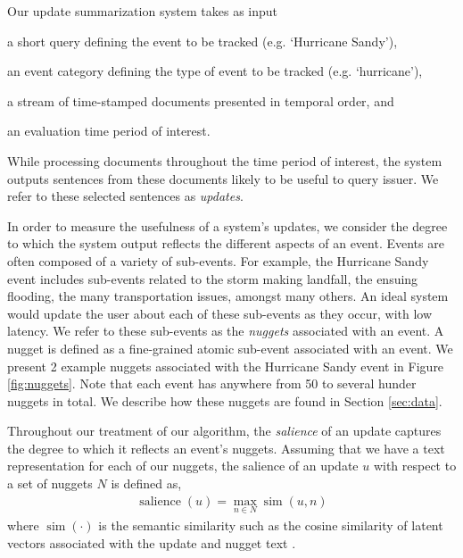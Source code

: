 \label{sec:methods}

Our update summarization system takes as input 
\begin{enumerate*}[label=\itshape\alph*\upshape)]
  \item a short query defining the event to be tracked (e.g. `Hurricane Sandy'), 
  \item an event category defining the type of event to be tracked (e.g. `hurricane'), 
  \item a stream of time-stamped documents %
  presented in temporal order, and \item an evaluation time period of interest.
\end{enumerate*} 
While processing documents
throughout the time period of interest, the system outputs sentences
from these documents likely to be useful to query issuer.  We refer
to these selected sentences as \emph{updates}.

In order to measure the usefulness of a system's updates, we consider
the degree to which the system output reflects the different
aspects of an event.  Events are often composed of a variety of sub-events.  
For example, the Hurricane Sandy
event includes sub-events related to the storm making landfall,
the ensuing flooding, the many transportation issues, amongst many
others.  An ideal system would update the user about each of these
sub-events as they occur, with low latency.  
We refer to these
sub-events as the \emph{nuggets} associated with an event.  A nugget is
defined as a fine-grained atomic sub-event associated with an event.  
We present 2 example nuggets associated with the Hurricane
Sandy event 
in Figure \ref{fig:nuggets}. Note that each event has anywhere from 50 to
several hunder nuggets in total.
We describe how these 
nuggets are found in Section \ref{sec:data}.




Throughout our treatment of our algorithm, the \emph{salience} 
of an update captures the degree to which it reflects an 
event's nuggets.  Assuming that we have a text representation 
for each of our nuggets, the salience of an update $u$  with respect to a set of nuggets $N$ is
defined as,
\begin{align}
\operatorname{salience}(u) = \operatorname{max}_{n \in N} 
\operatorname{sim}(u, n) \label{eq:salience}
\end{align}
where $\operatorname{sim}(\cdot)$ is the semantic similarity such as
the cosine similarity of latent vectors associated with the update and 
nugget text \cite{guo2012simple}. 

